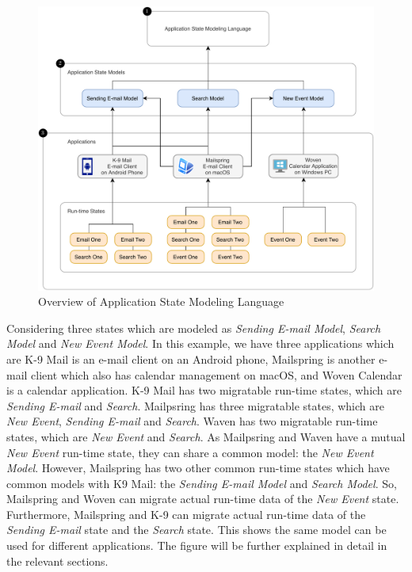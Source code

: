 \FloatBarrier
\begin{figure}[H]
    \includegraphics[scale=0.8]{../figures/asml-overview.pdf}
    \centering
    \caption{Overview of Application State Modeling Language}
    \label{fig:asml-overview}
\end{figure}
\FloatBarrier

Considering three states which are modeled as \textit{Sending E-mail Model}, \textit{Search Model} and \textit{New Event Model}. In this example, we have three applications which are K-9 Mail is an e-mail client on an Android phone, Mailspring is another e-mail client which also has calendar management on macOS, and Woven Calendar is a calendar application. K-9 Mail has two migratable run-time states, which are \textit{Sending E-mail} and \textit{Search}. Mailpsring has three migratable states, which are \textit{New Event}, \textit{Sending E-mail} and \textit{Search}. Waven has two migratable run-time states, which are \textit{New Event} and \textit{Search}. As Mailpsring and Waven have a mutual \textit{New Event} run-time state, they can share a common model: the \textit{New Event Model}. However, Mailspring has two other common run-time states which have common models with K9 Mail: the \textit{Sending E-mail Model} and \textit{Search Model}. So, Mailspring and Woven can migrate actual run-time data of the \textit{New Event} state. Furthermore, Mailspring and K-9 can migrate actual run-time data of the \textit{Sending E-mail} state and the \textit{Search} state. This shows the same model can be used for different applications. The figure will be further explained in detail in the relevant sections.


